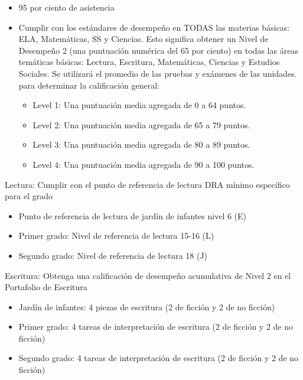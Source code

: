 \documentclass[12pt,letterpaper]{article}
\begin{document}
\begin{itemize}
\item 95 por ciento de asistencia
\pagebreak
\pagebreak
\vspace*{1.5cm}
\item Cumplir con los estándares de desempeño en TODAS las materias básicas: ELA, Matemáticas, SS y Ciencias. Esto significa obtener un Nivel de Desempeño 2 (una puntuación numérica del 65 por ciento) en todas las áreas temáticas básicas: Lectura, Escritura, Matemáticas, Ciencias y Estudios Sociales. Se utilizará el promedio de las pruebas y exámenes de las unidades.
para determinar la calificación general:
	\begin{itemize}
	\item Level 1: Una puntuación media agregada de 0 a 64 puntos.
	\item Level 2: Una puntuación media agregada de 65 a 79 puntos.
	\item Level 3: Una puntuación media agregada de 80 a 89 puntos.
	\item Level 4: Una puntuación media agregada de 90 a 100 puntos.
	\end{itemize}
\end{itemize}	

Lectura: Cumplir con el punto de referencia de lectura DRA mínimo específico para el grado\begin{itemize}
\item Punto de referencia de lectura de jardín de infantes nivel 6 (E)
\item Primer grado: Nivel de referencia de lectura 15-16 (L)
\item Segundo grado: Nivel de referencia de lectura 18 (J)
\end{itemize}

Escritura: Obtenga una calificación de desempeño acumulativa de Nivel 2 en el Portafolio de Escritura
\begin{itemize}
\item Jardín de infantes: 4 piezas de escritura (2 de ficción y 2 de no ficción)
\item Primer grado: 4 tareas de interpretación de escritura (2 de ficción y 2 de no ficción)
\item Segundo grado: 4 tareas de interpretación de escritura (2 de ficción y 2 de no ficción)
\end{itemize}
\end{document}
